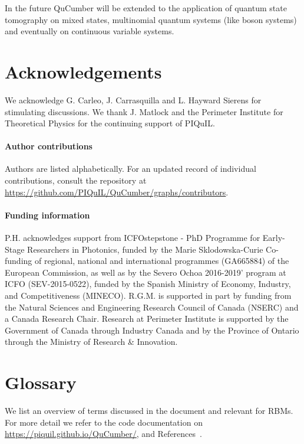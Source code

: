 \documentclass[submission, Phys]{SciPost}
\begin{document}
In the future QuCumber will be extended to the application of quantum state tomography on mixed states, multinomial quantum systems (like boson systems) and eventually on continuous variable systems.

\section*{Acknowledgements}
We acknowledge G. Carleo, J. Carrasquilla and L. Hayward Sierens for stimulating discussions.  
We thank J. Matlock and the Perimeter Institute for Theoretical Physics for the continuing support of PIQuIL.

\paragraph{Author contributions}
Authors are listed alphabetically. For an updated record of individual contributions, consult the repository at \url{https://github.com/PIQuIL/QuCumber/graphs/contributors}.

\paragraph{Funding information}
P.H. acknowledges support from ICFOstepstone - PhD Programme for Early-Stage Researchers in Photonics, funded by the Marie Sklodowska-Curie Co-funding of regional, national and international programmes (GA665884) of the European Commission, as well as by the Severo Ochoa 2016-2019' program at ICFO (SEV-2015-0522), funded by the Spanish Ministry of Economy, Industry, and Competitiveness (MINECO).
R.G.M. is supported in part by funding from the Natural Sciences and Engineering Research Council of Canada (NSERC) and a Canada Research Chair.
Research at Perimeter Institute is supported by the Government of Canada through Industry Canada and by the Province of Ontario through the Ministry of Research \& Innovation.


\appendix
\section{Glossary}
\label{Glossary}

We list an overview of terms discussed in the document and relevant for RBMs. For more detail we refer to the code documentation on \url{https://piquil.github.io/QuCumber/}, and References~\cite{hinton2002training, hinton2012practical}.
\end{document}
